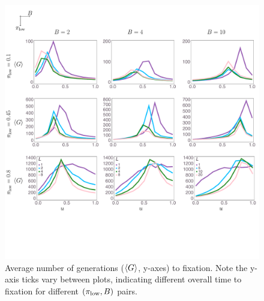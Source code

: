 \documentclass[letterpaper,11.5pt]{scrartcl}
\begin{document}
\begin{figure}
  \caption{Average number of generations ($\langle G \rangle$, y-axes) to fixation. 
    Note the y-axis ticks vary between plots, indicating different overall 
    time to fixation for different $(\pi_{\mathrm{low}}, B)$ pairs.} 
  \label{fig:steps}
\centering
    \includegraphics[width=\textwidth]{Figures/stepResultsPlots.pdf}
\end{figure}
\end{document}
